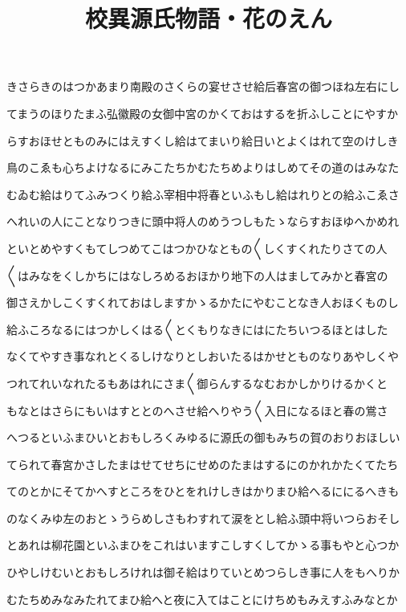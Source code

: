 \documentclass[a4paper,11pt,landscape]{ltjtarticle}
\title{校異源氏物語・花のえん}
\date{}
\begin{document}
\maketitle

きさらきのはつかあまり南殿のさくらの宴せさせ給后春宮の御つほね左右にし
\par\medskip
てまうのほりたまふ弘徽殿の女御中宮のかくておはするを折ふしことにやすか
\par\medskip
らすおほせとものみにはえすくし給はてまいり給日いとよくはれて空のけしき
\par\medskip
鳥のこゑも心ちよけなるにみこたちかむたちめよりはしめてその道のはみなた
\par\medskip
むゐむ給はりてふみつくり給ふ宰相中将春といふもし給はれりとの給ふこゑさ
\par\medskip
へれいの人にことなりつきに頭中将人のめうつしもたゝならすおほゆへかめれ
\par\medskip
といとめやすくもてしつめてこはつかひなともの〱しくすくれたりさての人
\par\medskip
〱はみなをくしかちにはなしろめるおほかり地下の人はましてみかと春宮の
\par\medskip
御さえかしこくすくれておはしますかゝるかたにやむことなき人おほくものし
\par\medskip
給ふころなるにはつかしくはる〱とくもりなきにはにたちいつるほとはした
\par\medskip
なくてやすき事なれとくるしけなりとしおいたるはかせとものなりあやしくや
\par\medskip
つれてれいなれたるもあはれにさま〱御らんするなむおかしかりけるかくと
\par\medskip
もなとはさらにもいはすととのへさせ給へりやう〱入日になるほと春の鴬さ
\par\medskip
へつるといふまひいとおもしろくみゆるに源氏の御もみちの賀のおりおほしい
\par\medskip
てられて春宮かさしたまはせてせちにせめのたまはするにのかれかたくてたち
\par\medskip
てのとかにそてかへすところをひとをれけしきはかりまひ給へるににるへきも
\par\medskip
のなくみゆ左のおとゝうらめしさもわすれて涙をとし給ふ頭中将いつらおそし
\par\medskip
とあれは柳花園といふまひをこれはいますこしすくしてかゝる事もやと心つか
\par\medskip
ひやしけむいとおもしろけれは御そ給はりていとめつらしき事に人をもへりか
\par\medskip
むたちめみなみたれてまひ給へと夜に入てはことにけちめもみえすふみなとか
\end{document}
